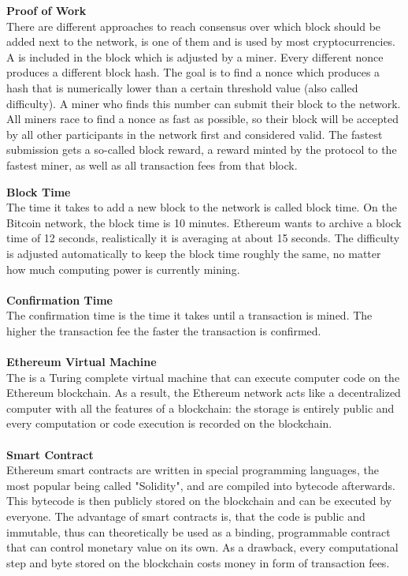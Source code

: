\textbf{Proof of Work}\\
There are different approaches to reach consensus over which block should be added next to the network,  is one of them and is used by most cryptocurrencies.
A  is included in the block which is adjusted by a miner.
Every different nonce produces a different block hash.
The goal is to find a nonce which produces a hash that is numerically lower than a certain threshold value (also called difficulty).
A miner who finds this number can submit their block to the network.
All miners race to find a nonce as fast as possible, so their block will be accepted by all other participants in the network first and considered valid.
The fastest submission gets a so-called block reward, a reward minted by the protocol to the fastest miner, as well as all transaction fees from that block.
\newpage

\textbf{Block Time}\\
The time it takes to add a new block to the network is called block time.
On the Bitcoin network, the block time is 10 minutes\cite{bitcoin-whitepaper}.
Ethereum wants to archive a block time of 12 seconds\cite{ethereum-blocktime}, realistically it is averaging at about 15 seconds\cite{ethereum-blocktime-chart}.
The difficulty is adjusted automatically to keep the block time roughly the same, no matter how much computing power is currently mining.
\\\\

\textbf{Confirmation Time}\\
The confirmation time is the time it takes until a transaction is mined.
The higher the transaction fee the faster the transaction is confirmed.
\\\\

\textbf{Ethereum Virtual Machine}\\
The  is a Turing complete virtual machine that can execute computer code on the Ethereum blockchain.
As a result, the Ethereum network acts like a decentralized computer with all the features of a blockchain: the storage is entirely public and every computation or code execution is recorded on the blockchain.
\\\\

\textbf{Smart Contract}\\
Ethereum smart contracts are written in special programming languages, the most popular being called "Solidity", and are compiled into bytecode afterwards.
This bytecode is then publicly stored on the blockchain and can be executed by everyone.
The advantage of smart contracts is, that the code is public and immutable, thus can theoretically be used as a binding, programmable contract that can control monetary value on its own.
As a drawback, every computational step and byte stored on the blockchain costs money in form of transaction fees.
\\\\

